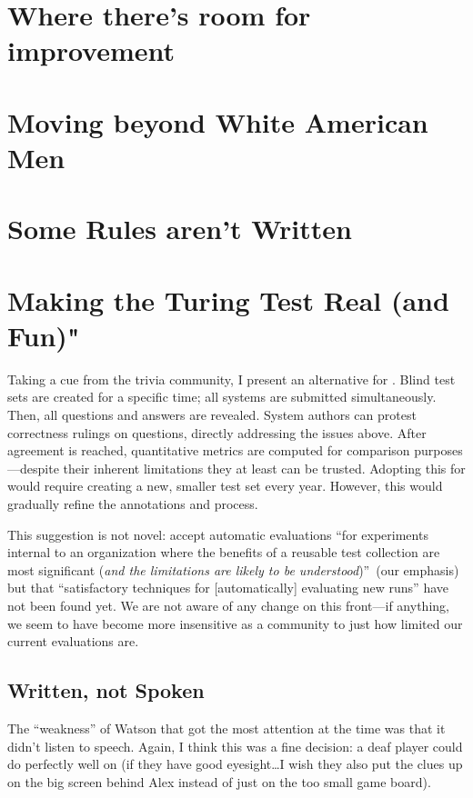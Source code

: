 
\section{Where there's room for improvement}
\section{Moving beyond White American Men}
\section{Some Rules aren't Written}
\section{Making the Turing Test Real (and Fun)"}


Taking a cue from the trivia community, I present an alternative
for .
Blind test sets are created for a specific time; all systems are submitted simultaneously.
Then, all questions and answers are revealed.
System authors can protest correctness rulings on questions, directly
addressing the issues above.
After agreement is reached,
quantitative metrics are computed for comparison purposes---despite their inherent limitations they at least can be
trusted.
Adopting this for  would require creating a new, smaller test
set every year.
However, this would gradually refine the annotations and process.

This suggestion is not novel: \citet{voorhees-00} accept automatic
evaluations ``for experiments internal to an organization where the
benefits of a reusable test collection are most significant (\emph{and
  the limitations are likely to be understood})''~(our emphasis) but
that ``satisfactory techniques for [automatically] evaluating new
runs'' have not been found yet.  We are not aware of any change on
this front---if anything, we seem to have become more insensitive as a
community to just how limited our current evaluations are.




\subsection{Written, not Spoken}

The ``weakness'' of Watson that got the most attention at the time was
that it didn't listen to speech.
%
Again, I think this was a fine decision: a deaf player could do
perfectly well on \jeopardy{} (if they have good eyesight\dots I
wish they also put the clues up on the big screen behind Alex
instead of just on the too small game board).

